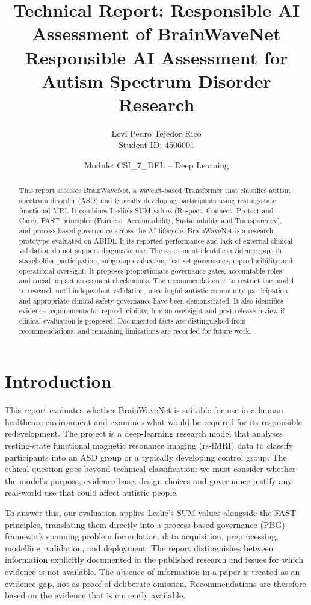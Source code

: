 \documentclass[11pt,a4paper]{article}
\title{\textbf{Technical Report: Responsible AI Assessment of BrainWaveNet}\\
\large Responsible AI Assessment for Autism Spectrum Disorder Research}
\author{Levi Pedro Tejedor Rico\\Student ID: 4506001}
\date{Module: CSI\_7\_DEL -- Deep Learning}
\begin{document}
\maketitle

\begin{abstract}
This report assesses BrainWaveNet, a wavelet-based Transformer that classifies autism spectrum disorder (ASD) and typically developing participants using resting-state functional MRI. It combines Leslie's SUM values (Respect, Connect, Protect and Care), FAST principles (Fairness, Accountability, Sustainability and Transparency), and process-based governance across the AI lifecycle. BrainWaveNet is a research prototype evaluated on ABIDE-I; its reported performance and lack of external clinical validation do not support diagnostic use. The assessment identifies evidence gaps in stakeholder participation, subgroup evaluation, test-set governance, reproducibility and operational oversight. It proposes proportionate governance gates, accountable roles and social impact assessment checkpoints. The recommendation is to restrict the model to research until independent validation, meaningful autistic community participation and appropriate clinical safety governance have been demonstrated. It also identifies evidence requirements for reproducibility, human oversight and post-release review if clinical evaluation is proposed. Documented facts are distinguished from recommendations, and remaining limitations are recorded for future work.
\end{abstract}

\tableofcontents
\newpage

\section{Introduction}
This report evaluates whether BrainWaveNet is suitable for use in a human healthcare environment and examines what would be required for its responsible redevelopment. The project is a deep-learning research model that analyses resting-state functional magnetic resonance imaging (rs-fMRI) data to classify participants into an ASD group or a typically developing control group. The ethical question goes beyond technical classification: we must consider whether the model's purpose, evidence base, design choices and governance justify any real-world use that could affect autistic people.

To answer this, our evaluation applies Leslie's SUM values alongside the FAST principles, translating them directly into a process-based governance (PBG) framework spanning problem formulation, data acquisition, preprocessing, modelling, validation, and deployment. The report distinguishes between information explicitly documented in the published research and issues for which evidence is not available. The absence of information in a paper is treated as an evidence gap, not as proof of deliberate omission. Recommendations are therefore based on the evidence that is currently available.
\end{document}
